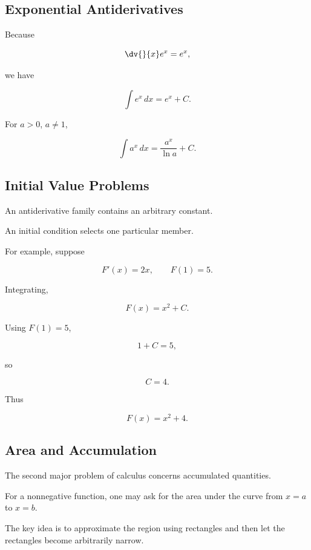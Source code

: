 \subsection{Exponential Antiderivatives}
\label{subsec:exponential-antiderivatives}

Because

\[ \dv{}{x}e^x=e^x, \]

we have

\[ \int e^x\,dx=e^x+C. \]

For \(a>0\), \(a\neq1\),

\[ \int a^x\,dx=\frac{a^x}{\ln a}+C. \]

\subsection{Initial Value Problems}
\label{subsec:initial-value-problems-antiderivatives}

An antiderivative family contains an arbitrary constant.

An initial condition selects one particular member.

For example, suppose

\[ F'(x)=2x,\qquad F(1)=5. \]

Integrating,

\[ F(x)=x^2+C. \]

Using \(F(1)=5\),

\[ 1+C=5, \]

so

\[ C=4. \]

Thus

\[ \boxed{F(x)=x^2+4.} \]

\subsection{Area and Accumulation}
\label{subsec:area-accumulation}

The second major problem of calculus concerns accumulated quantities.

For a nonnegative function, one may ask for the area under the curve from
\(x=a\) to \(x=b\).

The key idea is to approximate the region using rectangles and then let the
rectangles become arbitrarily narrow.

